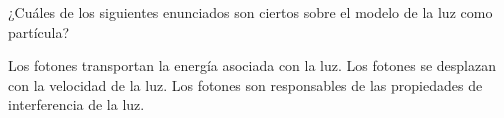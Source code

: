 ¿Cuáles de los siguientes enunciados son ciertos sobre el modelo
de la luz como partícula?

\begin{checkboxes}
    \CorrectChoice Los fotones transportan la energía asociada con la luz.
    \CorrectChoice Los fotones se desplazan con la velocidad de la luz.
    \choice Los fotones son responsables de las propiedades de
    interferencia de la luz.
\end{checkboxes}